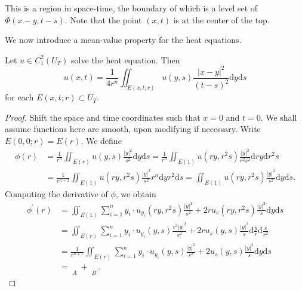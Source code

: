 This is a region in space-time, the boundary of which is a level set of $\Phi(x-y,t-s)$. Note that the point $(x,t)$ is at the center of the top.\par
We now introduce a mean-value property for the heat equations.
\begin{theorem}
Let $u\in C_1^2(U_T)$ solve the heat equation. Then 
$$
u\left( x,t \right) =\frac{1}{4r^n}\iint_{E\left( x,t;r \right)}{u\left( y,s \right) \frac{\left| x-y \right|^2}{\left( t-s \right) ^2}\mathrm{d}y\mathrm{d}s}
$$
for each $E(x,t;r)\subset U_T$.
\end{theorem}
\begin{proof}
Shift the space and time coordinates such that $x=0$ and $t=0$. We shall assume functions here are smooth, upon modifying if necessary. Write $E(0,0;r)=E(r)$. We define 
$$
\begin{aligned}
\phi \left( r \right) &=\frac{1}{r^n}\iint_{E\left( r \right)}{u\left( y,s \right) \frac{\left| y \right|^2}{s^2}\mathrm{d}y\mathrm{d}s}=\frac{1}{r^n}\iint_{E\left( 1 \right)}{u\left( ry,r^2s \right) \frac{\left| y \right|^2}{r^2s^2}\mathrm{d}ry\mathrm{d}r^2s}
\\
&=\frac{1}{r^{n+2}}\iint_{E\left( 1 \right)}{u\left( ry,r^2s \right) \frac{\left| y \right|^2}{s^2}r^n\mathrm{d}yr^2\mathrm{d}s}=\iint_{E\left( 1 \right)}{u\left( ry,r^2s \right) \frac{\left| y \right|^2}{s^2}\mathrm{d}y\mathrm{d}s}.
\end{aligned}
$$
Computing the derivative of $\phi$, we obtain 
$$
\begin{aligned}
\phi ^{\prime}\left( r \right) &=\iint_{E\left( 1 \right)}{\sum_{i=1}^n{y_i\cdot u_{y_i}\left( ry,r^2s \right) \frac{\left| y \right|^2}{s^2}}+2ru_s\left( ry,r^2s \right) \frac{\left| y \right|^2}{s}\mathrm{d}y\mathrm{d}s}
\\
&=\iint_{E\left( r \right)}{\sum_{i=1}^n{y_i\cdot u_{y_i}\left( y,s \right) \frac{r^2\left| y \right|^2}{s^2}+2ru_s\left( y,s \right) \frac{\left| y \right|^2}{s}\mathrm{d}\frac{y}{r}\mathrm{d}\frac{s}{r^2}}}
\\
&=\frac{1}{r^{n+1}}\iint_{E\left( r \right)}{\sum_{i=1}^n{y_i\cdot u_{y_i}\left( y,s \right) \frac{\left| y \right|^2}{s^2}}+2u_s\left( y,s \right) \frac{\left| y \right|^2}{s}\mathrm{d}y\mathrm{d}s}
\\
&=\mathop {\underbrace{\frac{1}{r^{n+1}}\iint_{E\left( r \right)}{\sum_{i=1}^n{y_i\cdot u_{y_i}\left( y,s \right) \frac{\left| y \right|^2}{s^2}}\mathrm{d}y\mathrm{d}s}}} \limits_{A}+\mathop {\underbrace{\frac{1}{r^{n+1}}\iint_{E\left( r \right)}{2u_s\left( y,s \right) \frac{\left| y \right|^2}{s}\mathrm{d}y\mathrm{d}s}}} \limits_{B}.

\end{aligned}$$
\end{proof}
